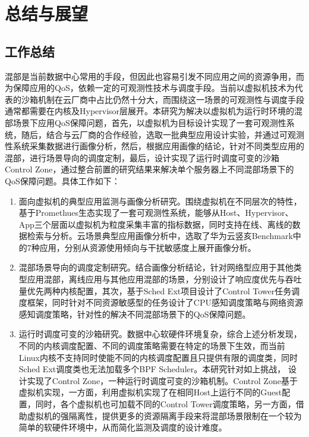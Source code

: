 \chapter{总结与展望}\label{chap:theories_tech}

\section{工作总结}

混部是当前数据中心常用的手段，但因此也容易引发不同应用之间的资源争用，而为保障应用的QoS，依赖一定的可观测性技术与调度手段。当前以虚拟机技术为代表的沙箱机制在云厂商中占比仍然十分大，而围绕这一场景的可观测性与调度手段通常都需要在内核及Hypervisor层展开。本研究为解决以虚拟机为运行时环境的混部场景下应用QoS保障问题，首先，以虚拟机为目标设计实现了一套可观测性系统，随后，结合与云厂商的合作经验，选取一批典型应用设计实验，并通过可观测性系统采集数据进行画像分析，然后，根据应用画像的结论，针对不同类型应用的混部，进行场景导向的调度定制，最后，设计实现了运行时调度可变的沙箱Control Zone，通过整合前置的研究结果来解决单个服务器上不同混部场景下的QoS保障问题。具体工作如下：

\begin{enumerate}
    \item 面向虚拟机的典型应用监测与画像分析研究。围绕虚拟机在不同层次的特性，基于Promethues生态实现了一套可观测性系统，能够从Host、Hypervisor、App三个层面以虚拟机为粒度采集丰富的指标数据，同时支持在线、离线的数据检索与分析。云场景典型应用画像分析中，选取了华为云竖亥Benchmark中的7种应用，分别从资源使用倾向与干扰敏感度上展开画像分析。
    \item 混部场景导向的调度定制研究。结合画像分析结论，针对网络型应用于其他类型应用混部，离线应用与其他应用混部的场景，分别设计了响应度优先与吞吐量优先两种内核配置，其次，基于Sched Ext项目设计了Control Tower任务调度框架，同时针对不同资源敏感型的任务设计了CPU感知调度策略与网络资源感知调度策略，针对性的解决不同混部场景下的QoS保障问题。
    \item 运行时调度可变的沙箱研究。数据中心软硬件环境复杂，综合上述分析发现，不同的内核调度配置、不同的调度策略需要在特定的场景下生效，而当前Linux内核不支持同时使能不同的内核调度配置且只提供有限的调度类，同时 Sched Ext调度类也无法加载多个BPF Scheduler。本研究针对如上挑战， 设计实现了Control Zone，一种运行时调度可变的沙箱机制。Control Zone基于虚拟机实现，一方面，利用虚拟机实现了在相同Host上运行不同的Guest配置，同时，各个虚拟机也可加载不同的Control Tower调度策略，另一方面，借助虚拟机的强隔离性，提供更多的资源隔离手段来将混部场景限制在一个较为简单的软硬件环境中，从而简化监测及调度的设计难度。
\end{enumerate}

